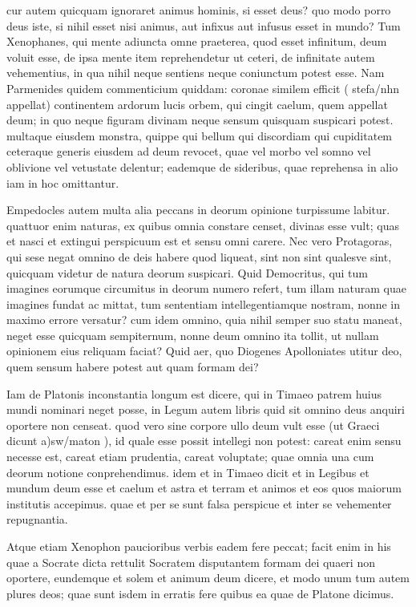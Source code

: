  cur autem quicquam ignoraret animus hominis, si esset deus? quo modo porro deus iste, si nihil esset nisi animus, aut infixus aut infusus esset in mundo? Tum Xenophanes, qui mente adiuncta omne praeterea, quod esset infinitum, deum voluit esse, de ipsa mente item reprehendetur ut ceteri, de infinitate autem vehementius, in qua nihil neque sentiens neque coniunctum potest esse. Nam Parmenides quidem commenticium quiddam: coronae similem efficit ( stefa/nhn appellat) continentem ardorum lucis orbem, qui cingit caelum, quem appellat deum; in quo neque figuram divinam neque sensum quisquam suspicari potest. multaque eiusdem monstra, quippe qui bellum qui discordiam qui cupiditatem ceteraque generis eiusdem ad deum revocet, quae vel morbo vel somno vel oblivione vel vetustate delentur; eademque de sideribus, quae reprehensa in alio iam in hoc omittantur.

 Empedocles autem multa alia peccans in deorum opinione turpissume labitur. quattuor enim naturas, ex quibus omnia constare censet, divinas esse vult; quas et nasci et extingui perspicuum est et sensu omni carere. Nec vero Protagoras, qui sese negat omnino de deis habere quod liqueat, sint non sint qualesve sint, quicquam videtur de natura deorum suspicari. Quid Democritus, qui tum imagines eorumque circumitus in deorum numero refert, tum illam naturam quae imagines fundat ac mittat, tum sententiam intellegentiamque nostram, nonne in maximo errore versatur? cum idem omnino, quia nihil semper suo statu maneat, neget esse quicquam sempiternum, nonne deum omnino ita tollit, ut nullam opinionem eius reliquam faciat? Quid aer, quo Diogenes Apolloniates utitur deo, quem sensum habere potest aut quam formam dei?

 Iam de Platonis inconstantia longum est dicere, qui in Timaeo patrem huius mundi nominari neget posse, in Legum autem libris quid sit omnino deus anquiri oportere non censeat. quod vero sine corpore ullo deum vult esse (ut Graeci dicunt a)sw/maton ), id quale esse possit intellegi non potest: careat enim sensu necesse est, careat etiam prudentia, careat voluptate; quae omnia una cum deorum notione conprehendimus. idem et in Timaeo dicit et in Legibus et mundum deum esse et caelum et astra et terram et animos et eos quos maiorum institutis accepimus. quae et per se sunt falsa perspicue et inter se vehementer repugnantia.

 Atque etiam Xenophon paucioribus verbis eadem fere peccat; facit enim in his quae a Socrate dicta rettulit Socratem disputantem formam dei quaeri non oportere, eundemque et solem et animum deum dicere, et modo unum tum autem plures deos; quae sunt isdem in erratis fere quibus ea quae de Platone dicimus.

